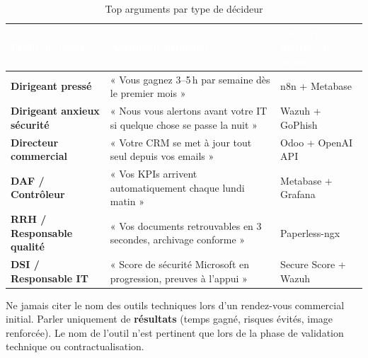 \begin{table}[htbp]
  \centering
  \caption{Top arguments par type de décideur}
  \renewcommand{\arraystretch}{1.5}
  \begin{tabularx}{\linewidth}{>{\bfseries}p{3cm} X X}
    \toprule
    \rowcolor{tabheader}
    \textcolor{white}{\textbf{Profil décideur}} &
    \textcolor{white}{\textbf{Argument principal}} &
    \textcolor{white}{\textbf{Outil clé à mettre en avant}} \\
    \midrule
    Dirigeant pressé & « Vous gagnez 3–5\,h par semaine dès le premier mois » & n8n + Metabase \\
    \rowcolor{rowgray}
    Dirigeant anxieux sécurité & « Nous vous alertons avant votre IT si quelque chose se passe la nuit » & Wazuh + GoPhish \\
    Directeur commercial & « Votre CRM se met à jour tout seul depuis vos emails » & Odoo + OpenAI API \\
    \rowcolor{rowgray}
    DAF / Contrôleur & « Vos KPIs arrivent automatiquement chaque lundi matin » & Metabase + Grafana \\
    RRH / Responsable qualité & « Vos documents retrouvables en 3 secondes, archivage conforme » & Paperless-ngx \\
    \rowcolor{rowgray}
    DSI / Responsable IT & « Score de sécurité Microsoft en progression, preuves à l'appui » & Secure Score + Wazuh \\
    \bottomrule
  \end{tabularx}
\end{table}

\begin{attention}
  Ne jamais citer le nom des outils techniques lors d'un rendez-vous commercial initial. Parler uniquement de \textbf{résultats} (temps gagné, risques évités, image renforcée). Le nom de l'outil n'est pertinent que lors de la phase de validation technique ou contractualisation.
\end{attention}
